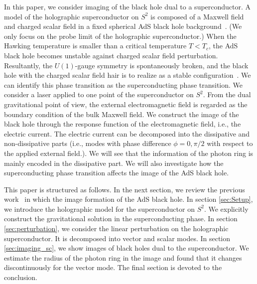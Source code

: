 \documentclass[a4paper,11pt]{article}
\begin{document}
    In this paper, we consider imaging of the black hole dual to a superconductor.
    A model of the holographic superconductor on $S^2$ is composed of a Maxwell field and charged scalar field in a fixed spherical AdS black hole background~\cite{Gubser:2008px,Hartnoll:2008vx,Hartnoll:2008kx}.
    (We only focus on the probe limit of the holographic superconductor.) 
    When the Hawking temperature is smaller than a critical temperature $T<T_c$, the AdS black hole becomes unstable against charged scalar field perturbation. 
    Resultantly, the $U(1)$-gauge symmetry is spontaneously broken, and the black hole with the charged scalar field hair is to realize as a stable configuration~\cite{Murata:2010dx,Kanno:2010pq,Bhaseen:2012gg,Bosch:2016vcp}.
    We can identify this phase transition  as the superconducting phase transition.
    We consider a laser applied to one point of the superconductor on $S^2$.
    From the dual gravitational point of view, the external electromagnetic field is regarded as the boundary condition of the bulk Maxwell field.
    We construct the image of the black hole through the response function of the electromagnetic field, i.e., the electric current.
    The electric current can be decomposed into the dissipative and non-dissipative parts (i.e., modes with phase difference $\phi=0, \pi/2$ with respect to the applied external field.).
    We will see that the information of the photon ring is mainly encoded in the dissipative part.
    We will also investigate how the superconducting phase transition affects the image of the AdS black hole.

    This paper is structured as follows.  
    In the next section, we review the previous work~\cite{Hashimoto:2018okj,Hashimoto:2019jmw} in which the image formation of the AdS black hole.
    In section \ref{sec:Setup}, we introduce the holographic model for the superconductor on $S^2$. We explicitly construct the gravitational solution in the superconducting phase.
    In section \ref{sec:perturbation}, we consider the linear perturbation on the holographic superconductor. It is decomposed into vector and scalar modes. 
    In section \ref{sec:imaging_sc}, we show images of black holes dual to the superconductor. We estimate the radius of the photon ring in the image and found that it changes discontinuously for the vector mode.
    The final section is devoted to the conclusion.
\end{document}
